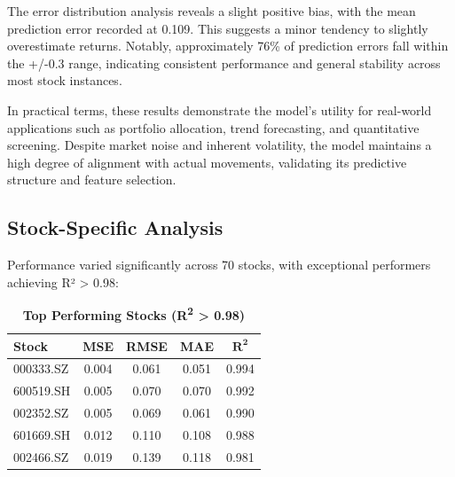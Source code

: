 \documentclass[3p,times,procedia]{elsarticle}
\begin{document}
The error distribution analysis reveals a slight positive bias, with the mean prediction error recorded at 0.109. This suggests a minor tendency to slightly overestimate returns. Notably, approximately 76\% of prediction errors fall within the +/-0.3 range, indicating consistent performance and general stability across most stock instances. 

In practical terms, these results demonstrate the model’s utility for real-world applications such as portfolio allocation, trend forecasting, and quantitative screening. Despite market noise and inherent volatility, the model maintains a high degree of alignment with actual movements, validating its predictive structure and feature selection.


\subsection{Stock-Specific Analysis}
\vspace{-2pt}
Performance varied significantly across 70 stocks, with exceptional performers achieving R² > 0.98:

\begin{table}[!ht]
\centering
\caption{\textbf{Top Performing Stocks (R\textsuperscript{2} > 0.98)}}
\renewcommand{\arraystretch}{1.1}
\setlength{\tabcolsep}{8pt}
\begin{tabular}{|l|c|c|c|c|}
\hline
\textbf{Stock} & \textbf{MSE} & \textbf{RMSE} & \textbf{MAE} & \textbf{$\mathbf{R^2}$} \\
\hline
000333.SZ  & 0.004 & 0.061 & 0.051 & 0.994 \\
600519.SH  & 0.005 & 0.070 & 0.070 & 0.992 \\
002352.SZ  & 0.005 & 0.069 & 0.061 & 0.990 \\
601669.SH  & 0.012 & 0.110 & 0.108 & 0.988 \\
002466.SZ  & 0.019 & 0.139 & 0.118 & 0.981 \\
\hline
\end{tabular}
\end{table}
\end{document}
